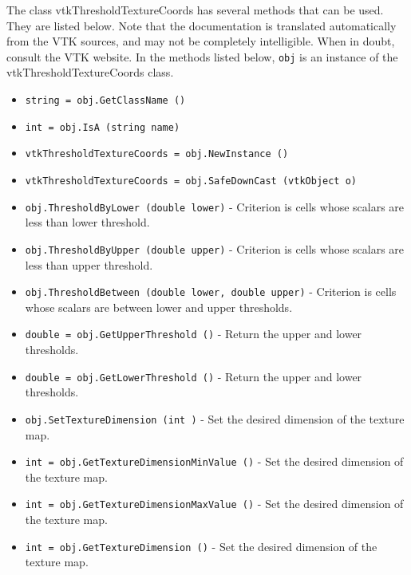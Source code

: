The class vtkThresholdTextureCoords has several methods that can be used.
  They are listed below.
Note that the documentation is translated automatically from the VTK sources,
and may not be completely intelligible.  When in doubt, consult the VTK website.
In the methods listed below, \verb|obj| is an instance of the vtkThresholdTextureCoords class.
\begin{itemize}
\item  \verb|string = obj.GetClassName ()|

\item  \verb|int = obj.IsA (string name)|

\item  \verb|vtkThresholdTextureCoords = obj.NewInstance ()|

\item  \verb|vtkThresholdTextureCoords = obj.SafeDownCast (vtkObject o)|

\item  \verb|obj.ThresholdByLower (double lower)| -  Criterion is cells whose scalars are less than lower threshold.

\item  \verb|obj.ThresholdByUpper (double upper)| -  Criterion is cells whose scalars are less than upper threshold.

\item  \verb|obj.ThresholdBetween (double lower, double upper)| -  Criterion is cells whose scalars are between lower and upper thresholds.

\item  \verb|double = obj.GetUpperThreshold ()| -  Return the upper and lower thresholds.

\item  \verb|double = obj.GetLowerThreshold ()| -  Return the upper and lower thresholds.

\item  \verb|obj.SetTextureDimension (int )| -  Set the desired dimension of the texture map.

\item  \verb|int = obj.GetTextureDimensionMinValue ()| -  Set the desired dimension of the texture map.

\item  \verb|int = obj.GetTextureDimensionMaxValue ()| -  Set the desired dimension of the texture map.

\item  \verb|int = obj.GetTextureDimension ()| -  Set the desired dimension of the texture map.


\end{itemize}
